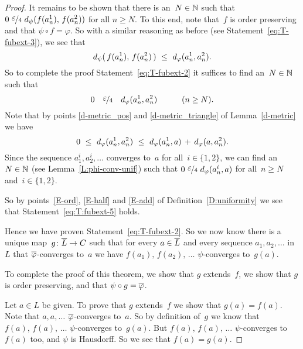 \documentclass[main.tex]{subfiles}
\begin{document}
\begin{proof}
It remains to be shown that there is an~$N\in \mathbb{N}$
such that 
$0\  \smash{\nicefrac{\textstyle{\varepsilon}}{4}} \  d_{\smash{\psi}}(f(a^1_n),\,f(a^2_n))$
for all $n\geq N$.
To this end, note that~$f$ is order preserving
and that $\psi \circ f = \varphi$.
So with a similar reasoning as before (see Statement~\eqref{eq:T-fubext-3}),
we see that
\begin{equation*}
\ld\psi(\,f(a^1_n),\,f(a^2_n)\,)
\ \leq\ 
\ld\varphi(a^1_n, a^2_n).
\end{equation*}
So to complete the proof Statement~\eqref{eq:T-fubext-2}
it suffices to find an~$N\in\mathbb{N}$ such that 
\begin{equation}
\label{eq:T:fubext-5}
0\quad\smash{\nicefrac{\textstyle{\varepsilon}}{4}}\quad d_{\smash{\varphi}}(a^1_n, a^2_n)
\qquad\quad(n\geq N).
\end{equation}
Note that
by
points \ref{d-metric_pos}
and \ref{d-metric_triangle}
of Lemma~\ref{d-metric}
we have
\begin{equation*}
0\ \leq\ 
\ld\varphi(a_n^1,a_n^2) 
\ \leq\ 
\ld\varphi(a_n^1,a)
\,+\,
\ld\varphi(a,a_n^2).
\end{equation*}
Since the sequence $a^i_1,a^i_2,\dotsc$
converges to~$a$ for all~$i\in\{1,2\}$,
we can find an~$N\in\mathbb{N}$
(see Lemma~\ref{L:phi-conv-unif})
such that $0\ \smash{\nicefrac{\textstyle{\varepsilon}}{4}} \ d_{\smash{\varphi}}(a_n^i,a)$
 for all~$n\geq N$ and~$i\in\{1,2\}$.

So by points~\ref{E-ord}, \ref{E-half} and \ref{E-add}
of Definition~\ref{D:uniformity}
we see that Statement~\eqref{eq:T:fubext-5} holds.

Hence we have proven Statement~\eqref{eq:T-fubext-2}.
So we now know there is a unique map~$g\colon \overline L \rightarrow C$
such that 
for every $a\in\overline L$
and every sequence $a_1,a_2,\dotsc$ in~$L$ that $\overline\varphi$-converges to~$a$
we have $f(a_1),\,f(a_2),\,\dotsc$ 
$\psi$-converges to~$g(a)$.

To complete the proof of this theorem,
we show that $g$ extends~$f$,
we show that $g$ is order preserving,
and that $\psi \circ g = \overline \varphi$.

Let $a\in L$ be given. To prove that $g$ extends~$f$
we show that $g(a)=f(a)$.
Note that $a,a,\dotsc$ $\overline\varphi$-converges to~$a$.
So by definition of~$g$ we know that $f(a),\,f(a),\,\dotsc$
$\psi$-converges to~$g(a)$.
But $f(a),\,f(a),\,\dotsc$ $\psi$-converges to~$f(a)$
too, and $\psi$ is Hausdorff.
So we see that $f(a)=g(a)$.


\end{proof}
\end{document}
